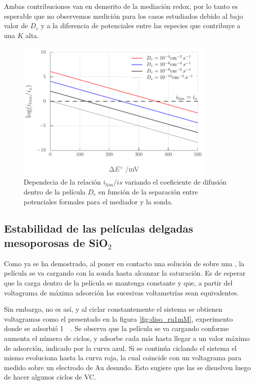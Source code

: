 		Ambas contribuciones van en demerito de la mediación redox, por lo tanto es esperable que no observemos medición para los casos estudiados debido al bajo valor de $D_e$ y a la diferencia de potenciales entre las especies que contribuye a una $K$ alta. 	


				\begin{figure}[h!]
				\centering
		 	    \includegraphics[width=0.87\textwidth]{Graficos/ilimite.pdf}
		        \caption[Dependencia de la mediación redox con $D_e$ y $K$]{Dependecia de la relación $i_{lim}/i{s}$ variando el coeficiente de difusión dentro de la película $D_e$ en función de la separación entre potenciales formales para el mediador y la sonda.}
		        \label{fig:ilimitee}
		      	\end{figure} 

	\subsection{Estabilidad de las películas delgadas mesoporosas de \texorpdfstring{SiO$_2$}{SiO2}}

		Como ya se ha demostrado, al poner en contacto una solución de \ru\space sobre una \pdmF, la película se va cargando con la sonda hasta alcanzar la saturación. Es de esperar que la carga dentro de la película se mantenga constante y que, a partir del voltagrama de máxima adsorción las sucesivas voltametrías sean equivalentes.

		Sin embargo, no es así, y al ciclar constantemente el sistema se obtienen voltagramas como el presentado en la figura \ref{fig:diso_ru1mM}, experimento donde se adsorbió \ru\space \SI{1}{\milli\Molar}. Se observa que la película se va cargando conforme aumenta el número de ciclos, y adsorbe cada más \ru\space hasta llegar a un valor máximo de adsorción, indicado por la curva azul. Si se continúa ciclando el sistema el mismo evoluciona hasta la curva roja, la cual coincide con un voltagrama para \ru\space medido sobre un electrodo de Au desnudo. Esto sugiere que las \pdmF\space se disuelven luego de hacer algunos ciclos de VC.


